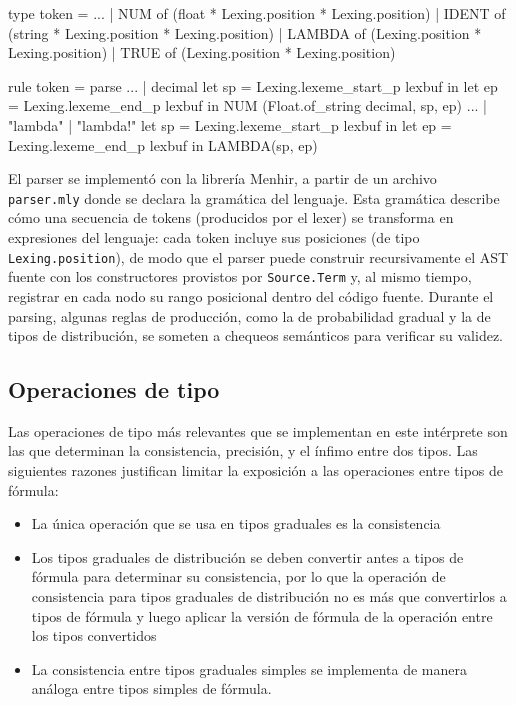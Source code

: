\begin{ocamlblock}[caption={Implementación de \texttt{token} y reconocimiento de lexemas},label={lst:imp-parse}]
  type token =
  ...
  | NUM        of (float  * Lexing.position * Lexing.position)
  | IDENT      of (string * Lexing.position * Lexing.position)
  | LAMBDA     of (Lexing.position * Lexing.position)
  | TRUE       of (Lexing.position * Lexing.position)

  rule token = parse
  ...
  | decimal {
    let sp = Lexing.lexeme_start_p lexbuf in
    let ep = Lexing.lexeme_end_p   lexbuf in
    NUM (Float.of_string decimal, sp, ep)
  }
  ...
  | "lambda" | "lambda!" { 
    let sp = Lexing.lexeme_start_p lexbuf in
    let ep = Lexing.lexeme_end_p   lexbuf in
    LAMBDA(sp, ep)
  }
\end{ocamlblock}

El parser se implementó con la librería Menhir, a partir de un archivo
\verb|parser.mly| donde se declara la gramática del lenguaje. Esta
gramática describe cómo una secuencia de tokens (producidos por el
lexer) se transforma en expresiones del lenguaje: cada token incluye sus
posiciones (de tipo \verb|Lexing.position|), de modo que el parser puede
construir recursivamente el AST fuente con los constructores provistos
por \verb|Source.Term| y, al mismo tiempo, registrar en cada nodo su
rango posicional dentro del código fuente.  Durante el parsing, algunas
reglas de producción, como la de probabilidad gradual y la de tipos de
distribución, se someten a chequeos semánticos para verificar su
validez.


\subsection{Operaciones de tipo}

Las operaciones de tipo más relevantes que se implementan en este
intérprete son las que determinan la consistencia, precisión, y el
ínfimo entre dos tipos. Las siguientes razones justifican limitar la
exposición a las operaciones entre tipos de fórmula:
\begin{itemize}
\item La única operación que se usa en tipos graduales es la consistencia
\item Los tipos graduales de distribución se deben convertir antes a tipos de fórmula
  para determinar su consistencia, por lo que la operación de consistencia para tipos
  graduales de distribución no es más que convertirlos a tipos de fórmula y luego aplicar
  la versión de fórmula de la operación entre los tipos convertidos
\item La consistencia entre tipos graduales simples se implementa de manera análoga
  entre tipos simples de fórmula.
\end{itemize}

